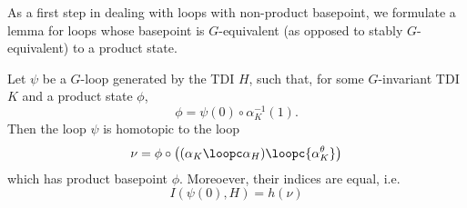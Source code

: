 As a first step in dealing with loops with non-product basepoint, we formulate a lemma for loops whose basepoint is $G$-equivalent (as opposed to stably $G$-equivalent) to a product state. 
\begin{lemma}\label{lem: loops with prod equiv}
	Let $\psi$ be a $G$-loop generated by the TDI $H$, such that, for some  $G$-invariant TDI $K$ and a product state $\phi$, 
	$$\phi=\psi(0)\circ \alpha^{-1}_K(1).$$ 
	Then the loop $\psi$ is homotopic to the loop 
	\begin{equation} \label{eq: def loop three parts}
	\nu=\phi \circ \left(({\alpha_{K}} \loopc \alpha_{H}) \loopc  {\alpha^\theta_{K}}\right)
	\end{equation}
	which has product basepoint $\phi$. Moreoever, their indices are equal, i.e.\
	\begin{equation} \label{eq: equality index inter}
	I(\psi(0),H)=h(\nu)
	\end{equation} 
\end{lemma}
